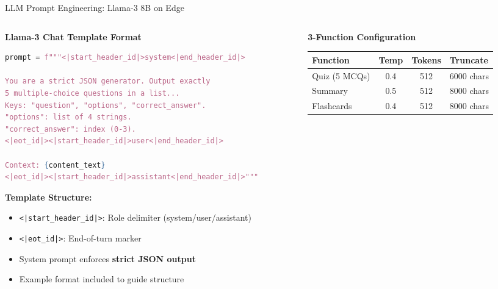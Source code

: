 \documentclass[aspectratio=169,10pt]{beamer}
\begin{document}
\begin{frame}{LLM Prompt Engineering: Llama-3 8B on Edge}
\begin{columns}[T]
\begin{column}{0.48\textwidth}
\textbf{Llama-3 Chat Template Format}

\vspace{2pt}
\begin{lstlisting}[language=Python, basicstyle=\ttfamily\tiny]
prompt = f"""<|start_header_id|>system<|end_header_id|>

You are a strict JSON generator. Output exactly
5 multiple-choice questions in a list...
Keys: "question", "options", "correct_answer".
"options": list of 4 strings.
"correct_answer": index (0-3).
<|eot_id|><|start_header_id|>user<|end_header_id|>

Context: {content_text}
<|eot_id|><|start_header_id|>assistant<|end_header_id|>"""
\end{lstlisting}

\vspace{4pt}
\footnotesize
\textbf{Template Structure:}
\begin{itemize}\scriptsize
  \item \texttt{<|start\_header\_id|>}: Role delimiter (system/user/assistant)
  \item \texttt{<|eot\_id|>}: End-of-turn marker
  \item System prompt enforces \textbf{strict JSON output}
  \item Example format included to guide structure
\end{itemize}
\end{column}

\begin{column}{0.48\textwidth}
\textbf{3-Function Configuration}

\vspace{4pt}
\footnotesize
\begin{tabular}{@{}lccl@{}}
\toprule
\textbf{Function} & \textbf{Temp} & \textbf{Tokens} & \textbf{Truncate} \\
\midrule
Quiz (5 MCQs) & 0.4 & 512 & 6000 chars \\
Summary & 0.5 & 512 & 8000 chars \\
Flashcards & 0.4 & 512 & 8000 chars \\
\bottomrule
\end{tabular}


\end{column}
\end{columns}
\end{frame}
\end{document}
